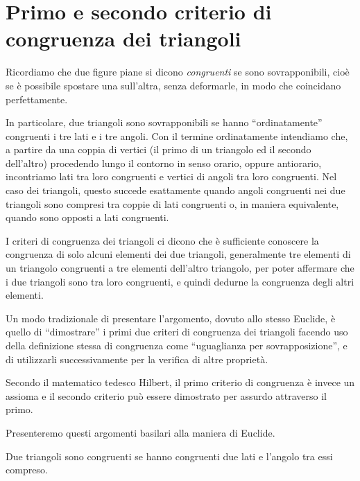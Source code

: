 \section{Primo e secondo criterio di congruenza dei triangoli}

Ricordiamo che due figure piane si dicono \emph{congruenti} se sono sovrapponibili, cioè se è possibile spostare una sull'altra, senza deformarle, in modo che coincidano perfettamente. 

In particolare, due triangoli sono sovrapponibili se hanno ``ordinatamente'' congruenti i tre lati e i tre angoli. Con il termine ordinatamente intendiamo che, a partire da una coppia di vertici (il primo di un triangolo ed il secondo dell'altro) procedendo lungo il contorno in senso orario, oppure antiorario, incontriamo lati tra loro congruenti e vertici di angoli tra loro congruenti. Nel caso dei triangoli, questo succede esattamente quando angoli congruenti nei due triangoli sono compresi tra coppie di lati congruenti o, in maniera equivalente, quando sono opposti a lati congruenti.

I criteri di congruenza dei triangoli ci dicono che è sufficiente conoscere la congruenza di solo alcuni elementi dei due triangoli, generalmente tre elementi di un triangolo congruenti a tre elementi dell'altro triangolo, per poter affermare che i due triangoli sono tra loro congruenti, e quindi dedurne la congruenza degli altri elementi.

Un modo tradizionale di presentare l'argomento, dovuto allo stesso Euclide, è quello di ``dimostrare'' i primi due criteri di congruenza dei triangoli facendo uso della definizione stessa di congruenza come ``uguaglianza per sovrapposizione'', e di utilizzarli successivamente per la verifica di altre proprietà.

Secondo il matematico tedesco Hilbert, il primo criterio di congruenza è invece un assioma e il secondo criterio può essere dimostrato per assurdo attraverso il primo. 

Presenteremo questi argomenti basilari alla maniera di Euclide.

\begin{teorema}
Due triangoli sono congruenti se hanno congruenti due lati e l'angolo tra essi compreso.
\end{teorema}

\begin{figure}[htb]
\centering
\end{figure}

